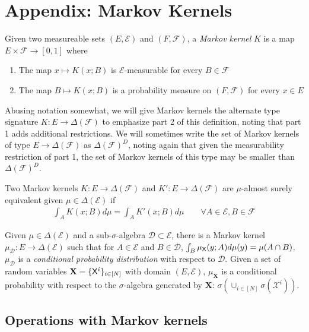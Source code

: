\section{Appendix: Markov Kernels}\label{app:markov_kernels}

Given two measureable sets $(E,\mathcal{E})$ and $(F,\mathcal{F})$, a \emph{Markov kernel} $K$ is a map $E\times \mathcal{F} \to [0,1]$ where
\begin{enumerate}
    \item The map $x\mapsto K(x;B)$ is $\mathcal{E}$-measurable for every $B\in\mathcal{F}$
    \item The map $B\mapsto K(x;B)$ is a probability measure on $(F,\mathcal{F})$ for every $x\in E$ 
\end{enumerate}

Abusing notation somewhat, we will give Markov kernels the alternate type signature $K:E\to \Delta(\mathcal{F})$ to emphasize part 2 of this definition, noting that part 1 adds additional restrictions. We will sometimes write the set of Markov kernels of type $E\to \Delta(\mathcal{F})$ as $\Delta(\mathcal{F})^D$, noting again that given the measurability restriction of part 1, the set of Markov kernels of this type may be smaller than $\Delta(\mathcal{F})^D$.

Two Markov kernels $K:E\to \Delta(\mathcal{F})$ and $K':E\to \Delta(\mathcal{F})$ are $\mu$-almost surely equivalent given $\mu\in \Delta(\mathcal{E})$ if
\begin{align}
    \int_A K(x;B) d\mu = \int_A K'(x;B) d\mu\qquad\forall A\in \mathcal{E}, B\in\mathcal{F}
\end{align}

Given $\mu\in \Delta(\mathcal{E})$ and a sub-$\sigma$-algebra $\mathcal{D}\subset\mathcal{E}$, there is a Markov kernel $\mu_{\mathcal{D}}:E\to\Delta(\mathcal{E})$ such that for $A\in\mathcal{E}$ and $B\in \mathcal{D}$, $\int_B \mu_{\mathsf{X}}(y;A) d\mu(y) = \mu(A\cap B)$. $\mu_{\mathcal{D}}$ is a \emph{conditional probability distribution} with respect to $\mathcal{D}$. Given a set of random variables $\mathbf{X}=\{\mathsf{X}^i\}_{i\in [N]}$ with domain $(E,\mathcal{E})$, $\mu_{\mathbf{X}}$ is a conditional probability with respect to the $\sigma$-algebra generated by $\mathbf{X}$: $\sigma(\cup_{i\in[N]}\sigma(\mathcal{X}^i))$.

\subsection{Operations with Markov kernels}

